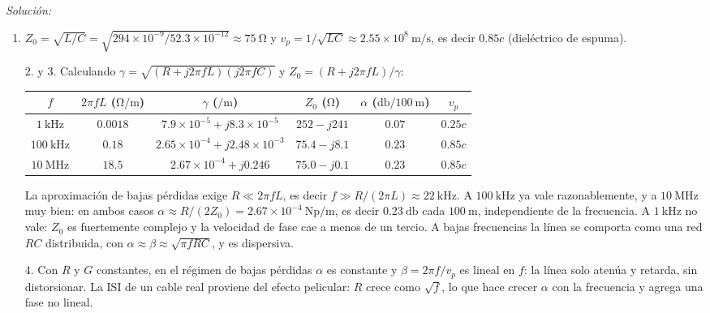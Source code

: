 \documentclass[a4paper,11pt]{article}
\newenvironment{solucion}[1][]{
\noindent \large \textsl{Solución:} \ifthenelse{\equal{#1}{}}{}{\emph{(#1)}}

\smallskip
}{
\bigskip
}
\begin{document}
\begin{solucion}
\begin{enumerate}
\item $Z_0=\sqrt{L/C}=\sqrt{294\times10^{-9}/52.3\times10^{-12}}\approx75\ \unit{\ohm}$ y $v_p=1/\sqrt{LC}\approx2.55\times10^8\ \unit{\meter/\second}$, es decir $0.85c$ (dieléctrico de espuma).
\item[2. y 3.] Calculando $\gamma=\sqrt{(R+j2\pi fL)(j2\pi fC)}$ y $Z_0=(R+j2\pi fL)/\gamma$:
\begin{center}
\begin{tabular}{c|c|c|c|c|c}
$f$ & $2\pi fL$ ($\unit{\ohm/\meter}$) & $\gamma$ ($\unit{\per\meter}$) & $Z_0$ ($\unit{\ohm}$) & $\alpha$ ($\unit{\decibel}/100\ \unit{\meter}$) & $v_p$\\ \hline
$1\ \unit{\kilo\hertz}$ & $0.0018$ & $7.9\times10^{-5}+j8.3\times10^{-5}$ & $252-j241$ & $0.07$ & $0.25c$\\
$100\ \unit{\kilo\hertz}$ & $0.18$ & $2.65\times10^{-4}+j2.48\times10^{-3}$ & $75.4-j8.1$ & $0.23$ & $0.85c$\\
$10\ \unit{\mega\hertz}$ & $18.5$ & $2.67\times10^{-4}+j0.246$ & $75.0-j0.1$ & $0.23$ & $0.85c$
\end{tabular}
\end{center}
La aproximación de bajas pérdidas exige $R\ll2\pi fL$, es decir $f\gg R/(2\pi L)\approx22\ \unit{\kilo\hertz}$. A $100\ \unit{\kilo\hertz}$ ya vale razonablemente, y a $10\ \unit{\mega\hertz}$ muy bien: en ambos casos $\alpha\approx R/(2Z_0)=2.67\times10^{-4}\ \unit{\neper/\meter}$, es decir $0.23\ \unit{\decibel}$ cada $100\ \unit{\meter}$, independiente de la frecuencia. A $1\ \unit{\kilo\hertz}$ no vale: $Z_0$ es fuertemente complejo y la velocidad de fase cae a menos de un tercio. A bajas frecuencias la línea se comporta como una red $RC$ distribuida, con $\alpha\approx\beta\approx\sqrt{\pi fRC}$, y es dispersiva.
\item[4.] Con $R$ y $G$ constantes, en el régimen de bajas pérdidas $\alpha$ es constante y $\beta=2\pi f/v_p$ es lineal en $f$: la línea solo atenúa y retarda, sin distorsionar. La ISI de un cable real proviene del efecto pelicular: $R$ crece como $\sqrt f$, lo que hace crecer $\alpha$ con la frecuencia y agrega una fase no lineal.
\end{enumerate}
\end{solucion}
\end{document}
